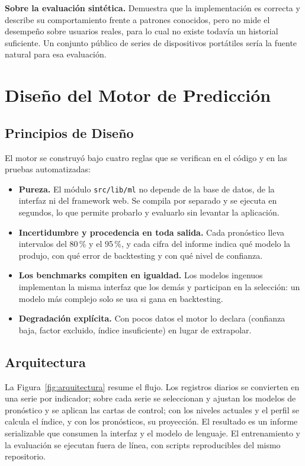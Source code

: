 \documentclass[12pt,letterpaper]{article}
\begin{document}
\textbf{Sobre la evaluación sintética.} Demuestra que la implementación es
correcta y describe su comportamiento frente a patrones conocidos, pero no mide
el desempeño sobre usuarios reales, para lo cual no existe todavía un historial
suficiente. Un conjunto público de series de dispositivos portátiles sería la
fuente natural para esa evaluación.

\newpage

\section{Diseño del Motor de Predicción}
\label{sec:motor}

\subsection{Principios de Diseño}

El motor se construyó bajo cuatro reglas que se verifican en el código y en las
pruebas automatizadas:

\begin{itemize}
  \item \textbf{Pureza.} El módulo \texttt{src/lib/ml} no depende de la base de
    datos, de la interfaz ni del framework web. Se compila por separado y se
    ejecuta en segundos, lo que permite probarlo y evaluarlo sin levantar la
    aplicación.
  \item \textbf{Incertidumbre y procedencia en toda salida.} Cada pronóstico
    lleva intervalos del 80\,\% y el 95\,\%, y cada cifra del informe indica qué
    modelo la produjo, con qué error de backtesting y con qué nivel de confianza.
  \item \textbf{Los benchmarks compiten en igualdad.} Los modelos ingenuos
    implementan la misma interfaz que los demás y participan en la selección:
    un modelo más complejo solo se usa si gana en backtesting.
  \item \textbf{Degradación explícita.} Con pocos datos el motor lo declara
    (confianza baja, factor excluido, índice insuficiente) en lugar de
    extrapolar.
\end{itemize}

\subsection{Arquitectura}

La Figura~\ref{fig:arquitectura} resume el flujo. Los registros diarios se
convierten en una serie por indicador; sobre cada serie se seleccionan y ajustan
los modelos de pronóstico y se aplican las cartas de control; con los niveles
actuales y el perfil se calcula el índice, y con los pronósticos, su proyección.
El resultado es un informe serializable que consumen la interfaz y el modelo de
lenguaje. El entrenamiento y la evaluación se ejecutan fuera de línea, con
scripts reproducibles del mismo repositorio.
\end{document}
